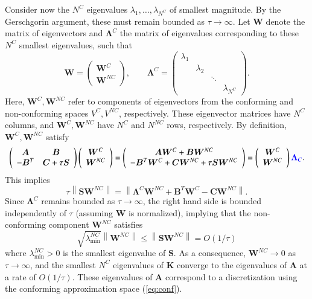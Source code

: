 \documentclass[preprint,10pt]{elsarticle}
\newcommand{\nor}[1]{\left\| #1 \right\|}
\newcommand{\LRp}[1]{\left( #1 \right)}
\newcommand{\note}[1]{{\color{blue}#1}}
\begin{document}
Consider now the $N^C$ eigenvalues \note{ $\lambda_1, \ldots, \lambda_{N^C}$} of smallest magnitude.  By the Gerschgorin argument, these must remain bounded as $\tau \rightarrow \infty$.  \note{Let $\bm{W}$ denote the matrix of eigenvectors and $\bm{\Lambda}^C$ the matrix of eigenvalues corresponding to these $N^C$ smallest eigenvalues, such that
\[
\bm{W} = \LRp{\begin{array}{c}
\bm{W}^C\\
\bm{W}^{NC}
\end{array}}, \qquad 
\bm{\Lambda}^C = \LRp{\begin{array}{cccc}
\lambda_1 & & &\\
& \lambda_2 & &\\
& & \ddots &\\
& & & \lambda_{N^C}
\end{array}
}.
 \]
Here, $\bm{W}^C, \bm{W}^{NC}$ refer to components of eigenvectors from the conforming and non-conforming spaces $V^C, V^{NC}$, respectively.  These eigenvector matrices have $N^C$ columns, and $\bm{W}^C, \bm{W}^{NC}$ have $N^{C}$ and $N^{NC}$ rows, respectively.  By definition, $\bm{W}^C, \bm{W}^{NC}$ satisfy}
\[
\left(\begin{array}{cc}
\bm{A} & \bm{B}\\
-\bm{B}^T & \bm{C} + \tau \bm{S}
\end{array}\right)
\left(\begin{array}{c}
\bm{W}^C
\\
\bm{W}^{NC}
\end{array}\right) = 
\left(\begin{array}{c}
\bm{A}\bm{W}^C + \bm{B}\bm{W}^{NC}\\
-\bm{B}^T\bm{W}^C + \bm{C}\bm{W}^{NC} + \tau \bm{S}\bm{W}^{NC}
\end{array}\right)
= 
\left(\begin{array}{c}
\bm{W}^C
\\
\bm{W}^{NC}
\end{array}\right) 
\note{\bm{\Lambda}_C}.
\]
This implies 
\[
\tau \nor{\bm{S}\bm{W}^{NC}} = \nor{\bm{\Lambda}^C \bm{W}^{NC} + \bm{B}^T\bm{W}^C  - \bm{C}\bm{W}^{NC}}.
\]
Since $\bm{\Lambda}^C$ remains bounded as $\tau\rightarrow \infty$, the right hand side is bounded independently of $\tau$ \note{(assuming $\bm{W}$ is normalized)}, implying that the non-conforming component $\bm{W}^{NC}$ satisfies
\[
\sqrt{\lambda^{NC}_{\min}}\nor{\bm{W}^{NC}} \leq \nor{\bm{S}\bm{W}^{NC}} = O(1/\tau)
\]
where $\lambda^{NC}_{\min} > 0$ is the smallest eigenvalue of $\bm{S}$.  As a consequence, $\bm{W}^{NC} \rightarrow 0$ as $\tau\rightarrow \infty$, and the smallest $N^C$ eigenvalues of $\bm{K}$ converge to the eigenvalues of $\bm{A}$ at a rate of $O(1/\tau)$.  These eigenvalues of $\bm{A}$ correspond to a discretization using the conforming approximation space (\ref{eq:conf}). 
\end{document}
